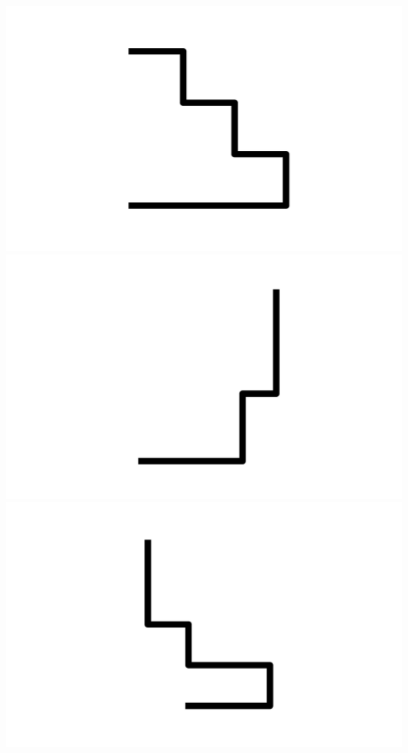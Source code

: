 \documentclass[]{report}
\begin{document}
\includegraphics[scale=.1]{pictures/21/state_cluster_shapes_247.pdf} 
\includegraphics[scale=.1]{pictures/21/state_cluster_shapes_248.pdf} 
\includegraphics[scale=.1]{pictures/21/state_cluster_shapes_249.pdf} 
\end{document}
